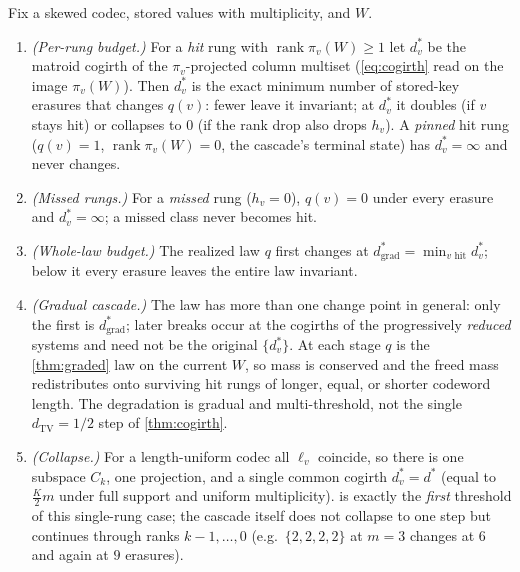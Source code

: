 \documentclass[sigconf,nonacm,anonymous,balance=false]{acmart}
\newcommand{\TV}{d_{\mathrm{TV}}}
\DeclareMathOperator{\rank}{rank}
\newcommand{\W}{W}                          %
\newcommand{\proj}{\pi}                     %
\begin{document}
\begin{theorem}
\label{thm:cogirth-graded}
Fix a skewed codec, stored values with multiplicity, and $\W$.
\begin{enumerate}
  \item \emph{(Per-rung budget.)} For a \emph{hit} rung with $\rank \proj_v(\W) \ge 1$ let
  $d^\ast_v$ be the matroid cogirth of the $\proj_v$-projected column multiset
  (\eqref{eq:cogirth} read on the image $\proj_v(\W)$). Then $d^\ast_v$ is the exact minimum
  number of stored-key erasures that changes $q(v)$: fewer leave it invariant; at $d^\ast_v$ it
  doubles (if $v$ stays hit) or collapses to $0$ (if the rank drop also drops $h_v$). A
  \emph{pinned} hit rung ($q(v) = 1$, $\rank \proj_v(\W) = 0$, the cascade's terminal state)
  has $d^\ast_v = \infty$ and never changes.
  \item \emph{(Missed rungs.)} For a \emph{missed} rung ($h_v = 0$), $q(v) = 0$ under every
  erasure and $d^\ast_v = \infty$; a missed class never becomes hit.
  \item \emph{(Whole-law budget.)} The realized law $q$ first changes at
  $d^\ast_{\mathrm{grad}} = \min_{v \text{ hit}} d^\ast_v$; below it every erasure leaves the
  entire law invariant.
  \item \emph{(Gradual cascade.)} The law has more than one change point in general: only
  the first is $d^\ast_{\mathrm{grad}}$; later breaks occur at the cogirths of the
  progressively \emph{reduced} systems and need not be the original $\{d^\ast_v\}$. At each
  stage $q$ is the \cref{thm:graded} law on the current $\W$, so mass is conserved and the
  freed mass redistributes onto surviving hit rungs of longer, equal, or shorter codeword
  length. The degradation is gradual and multi-threshold, not the single $\TV = 1/2$ step of
  \cref{thm:cogirth}.
  \item \emph{(Collapse.)} For a length-uniform codec all $\ell_v$ coincide, so there is one
  subspace $C_k$, one projection, and a single common cogirth $d^\ast_v = d^\ast$ (equal to
  $\tfrac{K}{2}m$ under full support and uniform multiplicity).  is exactly
  the \emph{first} threshold of this single-rung case; the cascade itself does not collapse to
  one step but continues through ranks $k{-}1,\dots,0$ (e.g.\ $\{2,2,2,2\}$ at $m=3$ changes at
  $6$ and again at $9$ erasures).
\end{enumerate}
\end{theorem}
\end{document}

